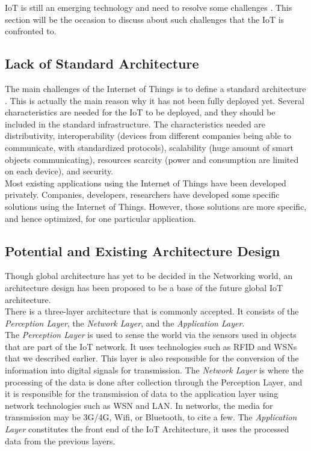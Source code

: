 IoT is still an emerging technology and need to resolve some challenges \cite{website:iot_challenge}. This section will be the occasion to discuss about such challenges that the IoT is confronted to.

\subsection{Lack of Standard Architecture}

The main challenges of the Internet of Things is to define a standard architecture \cite{abdmeziem2016architecting}. This is actually the main reason why it has not been fully deployed yet. Several characteristics are needed for the IoT to be deployed, and they should be included in the standard infrastructure. The characteristics needed are distributivity, interoperability (devices from different companies being able to communicate, with standardized protocols), scalability (huge amount of smart objects communicating), resources scarcity (power and consumption are limited on each device), and security.\\

Most existing applications using the Internet of Things have been developed privately. Companies, developers, researchers have developed some specific solutions using the Internet of Things. However, those solutions are more specific, and hence optimized, for one particular application.\\

\subsection{Potential and Existing Architecture Design}

Though global architecture has yet to be decided in the Networking world, an architecture design has been proposed to be a base of the future global IoT architecture. \\

There is a three-layer architecture that is commonly accepted. It consists of the \textit{Perception Layer}, the \textit{Network Layer}, and the \textit{Application Layer}. \\

The \textit{Perception Layer} is used to sense the world via the sensors used in objects that are part of the IoT network. It uses technologies such as RFID and WSNs that we described earlier. This layer is also responsible for the conversion of the information into digital signals for transmission. The \textit{Network Layer} is where the processing of the data is done after collection through the Perception Layer, and it is responsible for the transmission of data to the application layer using network technologies such as WSN and LAN. In networks, the media for transmission may be 3G/4G, Wifi, or Bluetooth, to cite a few. The \textit{Application Layer} constitutes the front end of the IoT Architecture, it uses the processed data from the previous layers.\\

